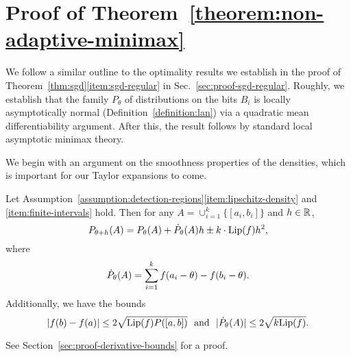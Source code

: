 
\section{Proof of Theorem~\ref{theorem:non-adaptive-minimax}}
\label{sec:proof-non-adaptive-minimax}

We follow a similar outline to the optimality results we establish
in the proof of Theorem~\ref{thm:sgd}\eqref{item:sgd-regular} in
Sec.~\ref{sec:proof-sgd-regular}.
Roughly, we establish that the family $P_\theta$ of distributions
on the bits $B_i$ is locally asymptotically normal
(Definition~\ref{definition:lan}) via a quadratic
mean differentiability argument. After this, the result
follows by standard local asymptotic minimax theory.

We begin with an argument on the smoothness properties of the densities,
which is important for our Taylor expansions to come.
\begin{lemma}
  \label{lemma:derivative-bounds}
  Let
  Assumption~\ref{assumption:detection-regions}\eqref{item:lipschitz-density}
  and \eqref{item:finite-intervals} hold. Then for any $A = \cup_{i = 1}^k
  \{[a_i, b_i]\}$ and $h \in \mathbb{R}$,
  \begin{equation*}
    P_{\theta + h}(A) = P_\theta(A) + \dot{P}_\theta(A) h \pm
    k \cdot {\rm \textup{Lip}}(f) h^2,
  \end{equation*}
  where
  \begin{equation}
    \dot{P}_\theta(A) = \sum_{i = 1}^k f(a_i - \theta) - f(b_i - \theta).
    \label{eqn:expansion-dPtheta}
  \end{equation}
  Additionally, we have the bounds
  \begin{equation}
    \label{eqn:bound-density-diffs}
    |f(b) - f(a)| \le 2 \sqrt{{\rm \textup{Lip}}(f) P([a, b])}
    ~~ \mbox{and} ~~
    |\dot{P}_\theta(A)| \le 2 \sqrt{k {\rm \textup{Lip}}(f)}.
  \end{equation}
\end{lemma}
\noindent
See Section~\ref{sec:proof-derivative-bounds} for a proof.

